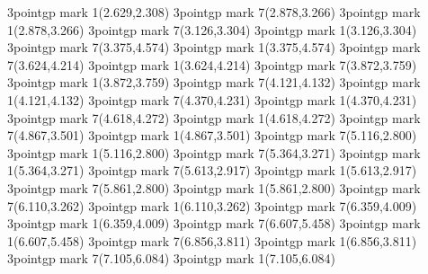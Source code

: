 \gp3point{gp mark 1}{}{(2.629,2.308)}
\gp3point{gp mark 7}{}{(2.878,3.266)}
\gp3point{gp mark 1}{}{(2.878,3.266)}
\gp3point{gp mark 7}{}{(3.126,3.304)}
\gp3point{gp mark 1}{}{(3.126,3.304)}
\gp3point{gp mark 7}{}{(3.375,4.574)}
\gp3point{gp mark 1}{}{(3.375,4.574)}
\gp3point{gp mark 7}{}{(3.624,4.214)}
\gp3point{gp mark 1}{}{(3.624,4.214)}
\gp3point{gp mark 7}{}{(3.872,3.759)}
\gp3point{gp mark 1}{}{(3.872,3.759)}
\gp3point{gp mark 7}{}{(4.121,4.132)}
\gp3point{gp mark 1}{}{(4.121,4.132)}
\gp3point{gp mark 7}{}{(4.370,4.231)}
\gp3point{gp mark 1}{}{(4.370,4.231)}
\gp3point{gp mark 7}{}{(4.618,4.272)}
\gp3point{gp mark 1}{}{(4.618,4.272)}
\gp3point{gp mark 7}{}{(4.867,3.501)}
\gp3point{gp mark 1}{}{(4.867,3.501)}
\gp3point{gp mark 7}{}{(5.116,2.800)}
\gp3point{gp mark 1}{}{(5.116,2.800)}
\gp3point{gp mark 7}{}{(5.364,3.271)}
\gp3point{gp mark 1}{}{(5.364,3.271)}
\gp3point{gp mark 7}{}{(5.613,2.917)}
\gp3point{gp mark 1}{}{(5.613,2.917)}
\gp3point{gp mark 7}{}{(5.861,2.800)}
\gp3point{gp mark 1}{}{(5.861,2.800)}
\gp3point{gp mark 7}{}{(6.110,3.262)}
\gp3point{gp mark 1}{}{(6.110,3.262)}
\gp3point{gp mark 7}{}{(6.359,4.009)}
\gp3point{gp mark 1}{}{(6.359,4.009)}
\gp3point{gp mark 7}{}{(6.607,5.458)}
\gp3point{gp mark 1}{}{(6.607,5.458)}
\gp3point{gp mark 7}{}{(6.856,3.811)}
\gp3point{gp mark 1}{}{(6.856,3.811)}
\gp3point{gp mark 7}{}{(7.105,6.084)}
\gp3point{gp mark 1}{}{(7.105,6.084)}
